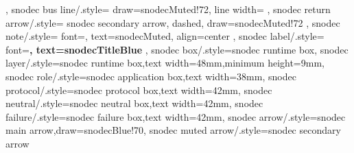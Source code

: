{{  },
  snodec bus line/.style={
    draw=snodecMuted!72,
    line width=\snodecBusLineWidth
  },
  snodec return arrow/.style={
    snodec secondary arrow,
    dashed,
    draw=snodecMuted!72
  },
  snodec note/.style={
    font=\sffamily\footnotesize,
    text=snodecMuted,
    align=center
  },
  snodec label/.style={
    font=\sffamily\bfseries\small,
    text=snodecTitleBlue
  },
  snodec box/.style={snodec runtime box},
  snodec layer/.style={snodec runtime box,text width=48mm,minimum height=9mm},
  snodec role/.style={snodec application box,text width=38mm},
  snodec protocol/.style={snodec protocol box,text width=42mm},
  snodec neutral/.style={snodec neutral box,text width=42mm},
  snodec failure/.style={snodec failure box,text width=42mm},
  snodec arrow/.style={snodec main arrow,draw=snodecBlue!70},
  snodec muted arrow/.style={snodec secondary arrow}
}

\newcommand{\snodecApplyFixedCanvas}{%
  \coordinate (snodecCanvasCenter) at (current bounding box.center);%
  \coordinate (snodecCanvasSW)%
    at ($(snodecCanvasCenter)+(-\snodecCanvasHalfWidth,0)$ |- current bounding box.south);%
  \coordinate (snodecCanvasNE)%
    at ($(snodecCanvasCenter)+(\snodecCanvasHalfWidth,0)$ |- current bounding box.north);%
  \path[use as bounding box]
    ([yshift=-\snodecCanvasVMargin]snodecCanvasSW)
    rectangle
    ([yshift=\snodecCanvasVMargin]snodecCanvasNE);%
}
